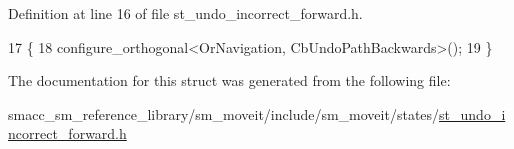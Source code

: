 Definition at line 16 of file st\+\_\+undo\+\_\+incorrect\+\_\+forward.\+h.


\begin{DoxyCode}
17     \{
18         configure\_orthogonal<OrNavigation, CbUndoPathBackwards>();
19     \}
\end{DoxyCode}


The documentation for this struct was generated from the following file\+:\begin{DoxyCompactItemize}
\item 
smacc\+\_\+sm\+\_\+reference\+\_\+library/sm\+\_\+moveit/include/sm\+\_\+moveit/states/\hyperlink{include_2sm__moveit_2states_2st__undo__incorrect__forward_8h}{st\+\_\+undo\+\_\+incorrect\+\_\+forward.\+h}\end{DoxyCompactItemize}
